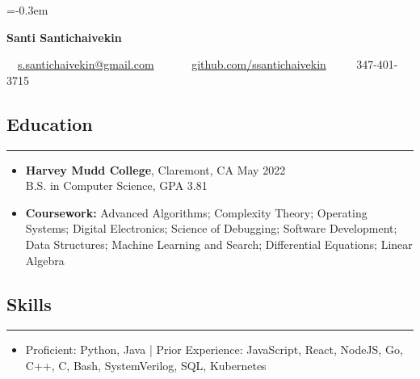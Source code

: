 \documentclass[10pt,letterpaper]{article}
\begin{document}
\fontsize{9.0}{11}\selectfont
\parskip=-0.3em

\begin{center}
{\Large \textbf{Santi Santichaivekin}}

\ \ \href{mailto:s.santichaivekin@gmail.com}{s.santichaivekin@gmail.com}\ \ 
\ \ \textbullet
\ \ \href{https://github.com/ssantichaivekin}{github.com/ssantichaivekin}
\ \ \textbullet
\ \ 347-401-3715

\end{center}

\subsection*{Education}
\vspace{-0.2em}
\hrule
\vspace{1em}
  \begin{itemize}[label={},leftmargin=*]
    \setlength\itemsep{0.8em}
    \parskip=-0.2em
    \item
    \textbf{Harvey Mudd College}, Claremont, CA \hfill
    May 2022\\
    B.S. in Computer Science, GPA 3.81
    \item \textbf{Coursework:}
  Advanced Algorithms; 
  Complexity Theory;
  Operating Systems;
  Digital Electronics;
  Science of Debugging;
  Software Development;
  Data Structures;
  Machine Learning and Search;
  Differential Equations;
  Linear Algebra
  \end{itemize}

\subsection*{Skills}
\vspace{-0.2em}
\hrule
\vspace{1em}
\begin{itemize}[label={},leftmargin=*]
\parskip=-0.25em
\item[]
Proficient:
  Python,
  Java
|
Prior Experience:
  JavaScript, 
  React, NodeJS,
  Go,
  C++,
  C,
  Bash,
  SystemVerilog,
  SQL,
  Kubernetes
    
\end{itemize}
\end{document}
